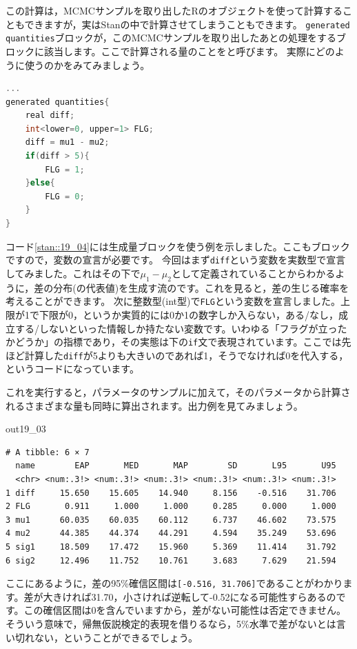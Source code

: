 \documentclass{ltjsbook}
\begin{document}
この計算は，MCMCサンプルを取り出したRのオブジェクトを使って計算することもできますが，実はStanの中で計算させてしまうこともできます。
\texttt{generated quantities}ブロックが，このMCMCサンプルを取り出したあとの処理をするブロックに該当します。ここで計算される量のことをと呼びます。
実際にどのように使うのかをみてみましょう。

\begin{lstlisting}[language=C++,label={stan::19_04},caption={生成量ブロックの利用}]
    ...
generated quantities{
    real diff;
    int<lower=0, upper=1> FLG;
    diff = mu1 - mu2;
    if(diff > 5){
        FLG = 1;
    }else{
        FLG = 0;
    }
}

\end{lstlisting}

コード\ref{stan::19_04}には生成量ブロックを使う例を示しました。ここもブロックですので，変数の宣言が必要です。
今回はまず\verb|diff|という変数を実数型で宣言してみました。これはその下で$\mu_1-\mu_2$として定義されていることからわかるように，差の分布(の代表値)を生成す流のです。これを見ると，差の生じる確率を考えることができます。
次に整数型(int型)で\verb|FLG|という変数を宣言しました。上限が1で下限が0，というか実質的には0か1の数字しか入らない，ある/なし，成立する/しないといった情報しか持たない変数です。いわゆる「フラグが立ったかどうか」の指標であり，その実態は下の\texttt{if}文で表現されています。ここでは先ほど計算した\verb|diff|が5よりも大きいのであれば1，そうでなければ0を代入する，というコードになっています。

これを実行すると，パラメータのサンプルに加えて，そのパラメータから計算されるさまざまな量も同時に算出されます。出力例を見てみましょう。
\begin{MCMCout}{}{out19_03}
	\begin{verbatim}
# A tibble: 6 × 7
  name        EAP       MED       MAP        SD       L95       U95
  <chr> <num:.3!> <num:.3!> <num:.3!> <num:.3!> <num:.3!> <num:.3!>
1 diff     15.650    15.605    14.940     8.156    -0.516    31.706
2 FLG       0.911     1.000     1.000     0.285     0.000     1.000
3 mu1      60.035    60.035    60.112     6.737    46.602    73.575
4 mu2      44.385    44.374    44.291     4.594    35.249    53.696
5 sig1     18.509    17.472    15.960     5.369    11.414    31.792
6 sig2     12.496    11.752    10.761     3.683     7.629    21.594
\end{verbatim}
\end{MCMCout}

ここにあるように，差の95\%確信区間は\verb|[-0.516, 31.706]|であることがわかります。差が大きければ31.70，小さければ逆転して-0.52になる可能性すらあるのです。この確信区間は0を含んでいますから，差がない可能性は否定できません。そういう意味で，帰無仮説検定的表現を借りるなら，5\%水準で差がないとは言い切れない，ということができるでしょう。
\end{document}
